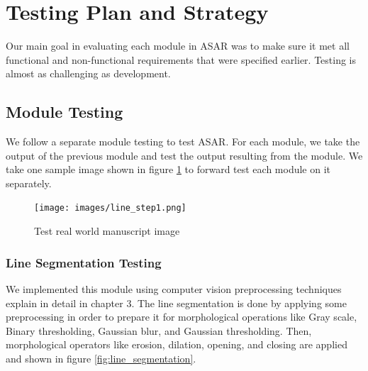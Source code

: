 \section{Testing Plan and Strategy}
Our main goal in evaluating each module in ASAR was to make sure it met all functional and non-functional requirements that were specified earlier. Testing is almost as challenging as development.

\subsection{Module Testing}
We follow a separate module testing to test ASAR. For each module, we take the output of the previous module and test the output resulting from the module. We take one sample image shown in figure \ref{fig:real-world-sample} to forward test each module on it separately.

\begin{figure}[H]
    \centering
    \texttt{[image: images/line\_step1.png]}
    \caption{Test real world manuscript image}
    \label{fig:real-world-sample}
\end{figure}

\subsubsection{Line Segmentation Testing}

We implemented this module using computer vision preprocessing techniques explain in detail in chapter 3. The line segmentation is done by applying some preprocessing in order to prepare it for morphological operations like Gray scale, Binary thresholding, Gaussian blur, and Gaussian thresholding. Then, morphological operators like erosion, dilation, opening, and closing are applied and shown in figure \ref{fig:line_segmentation}.

